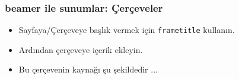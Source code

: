 \begin{frame}
  \frametitle{beamer ile sunumlar: Çerçeveler}
  \begin{itemize}
    \item Sayfaya/Çerçeveye başlık vermek için \texttt{frametitle} kullanın.
    \item Ardından çerçeveye içerik ekleyin.
    \item Bu çerçevenin kaynağı şu şekildedir ...
  \end{itemize}
\end{frame}

